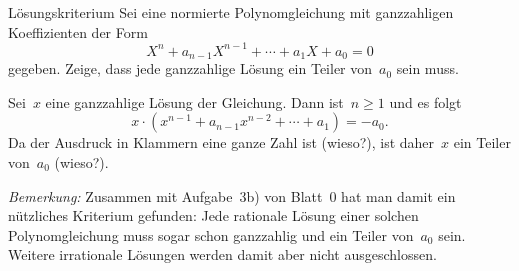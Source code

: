 \documentclass{algblatt}
\begin{document}

\begin{aufgabe}{Lösungskriterium}
Sei eine normierte Polynomgleichung mit ganzzahligen Koeffizienten
der Form
\[ X^n + a_{n-1} X^{n-1} + \cdots + a_1 X + a_0 = 0 \]
gegeben. Zeige, dass
jede ganzzahlige Lösung ein Teiler von~$a_0$ sein muss.
\begin{loesung}Sei~$x$ eine ganzzahlige Lösung der Gleichung. Dann ist~$n \geq
1$ und es folgt
\[ x \cdot (x^{n-1} + a_{n-1} x^{n-2} + \cdots + a_1) = -a_0. \]
Da der Ausdruck in Klammern eine ganze Zahl ist (wieso?), ist daher~$x$ ein
Teiler von~$a_0$ (wieso?).

\emph{Bemerkung:} Zusammen mit Aufgabe~3b) von Blatt~0 hat man damit ein
nützliches Kriterium gefunden: Jede rationale Lösung einer solchen
Polynomgleichung muss sogar schon ganzzahlig und ein Teiler von~$a_0$ sein.
Weitere irrationale Lösungen werden damit aber nicht ausgeschlossen.
\end{loesung}
\end{aufgabe}
\end{document}
